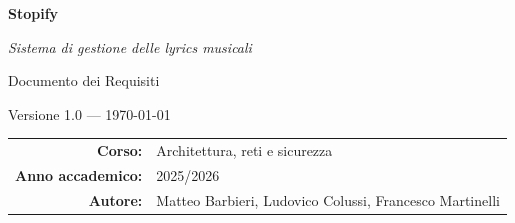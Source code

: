 \begin{titlepage}
    \centering
    \vspace*{2cm}

    {\Huge\bfseries Stopify\par}
    \vspace{0.4cm}
    {\Large\itshape Sistema di gestione delle lyrics musicali\par}

    \vspace{1.5cm}

    {\Large Documento dei Requisiti\par}
    \vspace{0.4cm}
    {\small Versione 1.0 --- \today\par}

    \vfill

    \begin{tabular}{rl}
        \textbf{Corso:} & Architettura, reti e sicurezza \\
        \textbf{Anno accademico:} & 2025/2026 \\
        \textbf{Autore:} & Matteo Barbieri, Ludovico Colussi, Francesco Martinelli \\
    \end{tabular}

    \vspace{2cm}
\end{titlepage}
